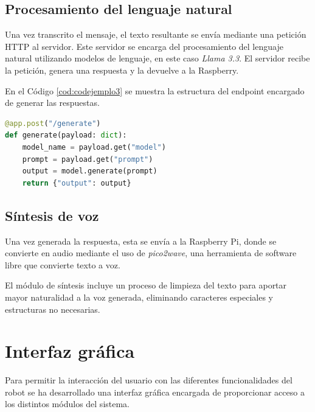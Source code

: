 \subsection{Procesamiento del lenguaje natural}

Una vez transcrito el mensaje, el texto resultante se envía mediante una petición HTTP al servidor. Este servidor se encarga del procesamiento del lenguaje natural utilizando modelos de lenguaje, en este caso \textit{Llama 3.3}. El servidor recibe la petición, genera una respuesta y la devuelve a la Raspberry.

En el Código \ref{cod:codejemplo3} se muestra la estructura del endpoint encargado de generar las respuestas.


\begin{code}[h]
\begin{lstlisting}[language=python]
@app.post("/generate")
def generate(payload: dict):
    model_name = payload.get("model")
    prompt = payload.get("prompt")
    output = model.generate(prompt)
    return {"output": output}
\end{lstlisting}
\caption{Endpoint de generación de respuestas del modelo de lenguaje}
\label{cod:codejemplo3}
\end{code}


\subsection{Síntesis de voz}
\vspace{0.2cm}

Una vez generada la respuesta, esta se envía a la Raspberry Pi, donde se convierte en audio mediante el uso de \textit{pico2wave}, una herramienta de software libre que convierte texto a voz.

\vspace{0.2cm}

El módulo de síntesis incluye un proceso de limpieza del texto para aportar mayor naturalidad a la voz generada, eliminando caracteres especiales y estructuras no necesarias.



\section{Interfaz gráfica}
\label{sec:Interfaz gráfica}

Para permitir la interacción del usuario con las diferentes funcionalidades del robot se ha desarrollado una interfaz gráfica encargada de proporcionar acceso a los distintos módulos del sistema.

